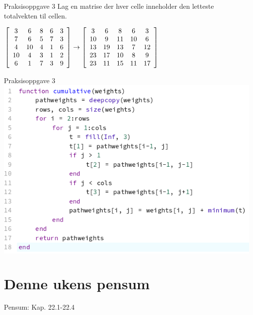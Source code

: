 \documentclass[14pt]{beamer}
\begin{document}
\begin{frame}{Praksisoppgave 3}
    Lag en matrise der hver celle inneholder den letteste totalvekten til cellen.

    \vfill
    \centering
    \begin{math}
        \left[
        \begin{array}{c c c c c}
           3 & 6 & 8 & 6 & 3 \\
           7 & 6 & 5 & 7 & 3 \\
           4 & 10 & 4 & 1 & 6 \\
           10 & 4 & 3 & 1 & 2 \\
           6 & 1 & 7 & 3 & 9 \\
        \end{array}
        \right]
        \rightarrow
        \left[
        \begin{array}{c c c c c}
           3 & 6 & 8 & 6 & 3 \\
           10 & 9 & 11 & 10 & 6 \\
           13 & 19 & 13 & 7 & 12 \\
           23 & 17 & 10 & 8 & 9 \\
           23 & 11 & 15 & 11 & 17 \\
        \end{array}
        \right]
    \end{math}
\end{frame}
\begin{frame}[fragile]{Praksisoppgave 3}
    \includegraphics[width=\textwidth]{06p_q3_sol.png}
\end{frame}

\section{Denne ukens pensum}
\begin{frame}[standout]
    Pensum: Kap. 22.1-22.4
\end{frame}
\end{document}
